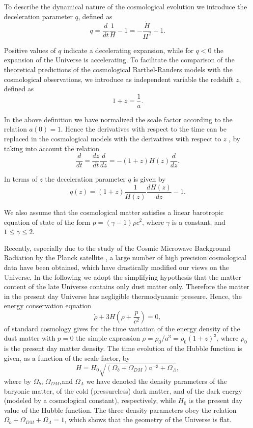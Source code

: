 \documentclass[aps,superscriptaddress, showpacs,preprintnumbers, superscriptaddress, nofootinbibt,twocolumn]{revtex4-2}
\def\be{\begin{equation}}
\def\ee{\end{equation}}
\begin{document}
To describe the dynamical nature of the cosmological evolution we introduce
the deceleration parameter $q$, defined as
\begin{equation}
q=\frac{d}{dt}\frac{1}{H}-1=-\frac{\dot{H}}{H^2}-1.
\end{equation}

Positive values of $q$ indicate a decelerating expansion, while for $q<0$
the expansion of the Universe is accelerating. To facilitate the comparison
of the theoretical predictions of the cosmological Barthel-Randers models
with the cosmological observations, we introduce as independent variable the
redshift $z$, defined as
\begin{equation}\label{redshift1}
1 + z =\frac{1}{a}.
\end{equation}

In the above definition we have normalized the scale factor according to the
relation $a(0) = 1$. Hence the derivatives with respect to the time can be
replaced in the cosmological models with the derivatives with respect to $z$%
, by taking into account the relation
\begin{equation}\label{redshift2}
\frac{d}{dt} =\frac{dz}{dt}\frac{d}{dz} = -(1 + z)H(z)\frac{d}{dz} .
\end{equation}

In terms of $z$ the deceleration parameter $q$ is given by
\begin{equation}
q(z) = (1 + z)\frac{1}{H(z)}\frac{dH(z)}{dz} - 1.
\end{equation}

We also assume that the cosmological matter satisfies a linear barotropic
equation of state of the form $p=(\gamma -1)\rho c^2$, where $\gamma $ is a
constant, and $1\leq \gamma \leq 2$.

Recently, especially due to the study of the Cosmic Microwave Background
Radiation by the Planck satellite \cite{1g, 1h}, a large number of high
precision cosmological data have been obtained, which have drastically
modified our views on the Universe. In the following we adopt the
simplifying hypothesis that the matter content of the late Universe contains
only dust matter only. Therefore the matter in the present day Universe has
negligible thermodynamic pressure. Hence, the energy conservation equation
\be
\dot{\rho}+3H\left(\rho+\frac{p}{c^2}\right)=0,
\ee
of standard cosmology gives for the time variation of
the energy density of the dust  matter with $p=0$ the simple expression $\rho= \rho
_0/a^3=\rho _0 (1+z)^3$, where $\rho _0$ is the present day matter density.
The time evolution of the Hubble function is given, as a function of the
scale factor, by \cite{e8}
\begin{equation}
H=H_0\sqrt{\left(\Omega _b+\Omega _{DM}\right)a^{-3}+\Omega _{\Lambda}},
\end{equation}
where by $\Omega _b$, $\Omega _{DM}$,and $\Omega _{\Lambda}$ we have denoted
the density parameters of the baryonic matter, of the cold (pressureless)
dark matter, and of the dark energy (modeled by a cosmological constant),
respectively, while $H_0$ is the present day value of the Hubble function.
The three density parameters obey the relation $\Omega _b+\Omega
_{DM}+\Omega _{\Lambda}=1$, which shows that the geometry of the Universe is
flat.
\end{document}
